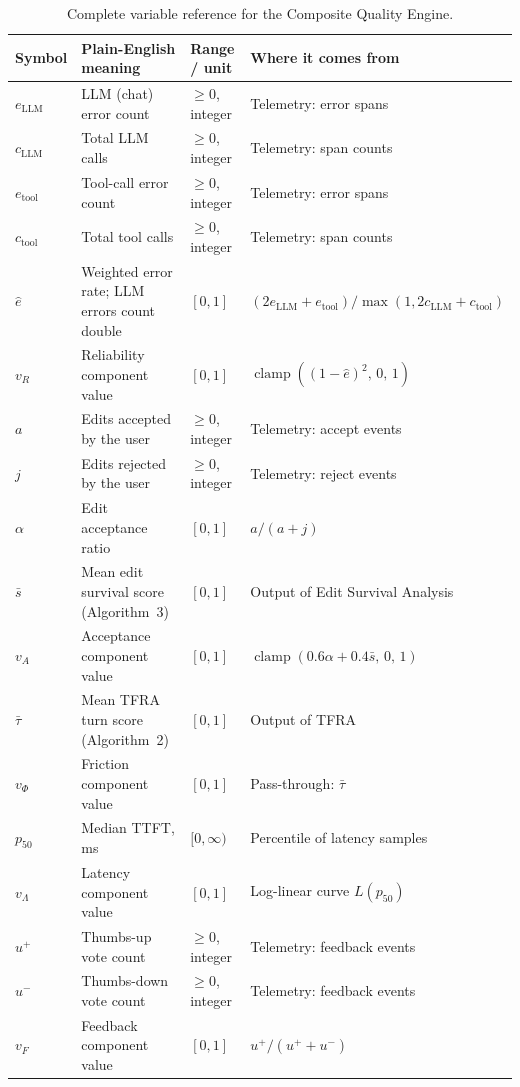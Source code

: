 \documentclass[11pt,a4paper]{article}
\newcommand{\clamp}[3]{\operatorname{clamp}\!\left(#1,\,#2,\,#3\right)}
\begin{document}
\begin{table}[h!]
\centering
\small
\caption{Complete variable reference for the Composite Quality Engine.}
\label{tab:var-ref}
\begin{tabular}{@{}p{1.7cm}p{4.4cm}p{2.0cm}p{5.2cm}@{}}
\toprule
Symbol & Plain-English meaning & Range / unit & Where it comes from \\
\midrule
$e_{\text{LLM}}$ & LLM (chat) error count & $\geq 0$, integer & Telemetry: error spans \\
$c_{\text{LLM}}$ & Total LLM calls & $\geq 0$, integer & Telemetry: span counts \\
$e_{\text{tool}}$ & Tool-call error count & $\geq 0$, integer & Telemetry: error spans \\
$c_{\text{tool}}$ & Total tool calls & $\geq 0$, integer & Telemetry: span counts \\
$\hat{e}$ & Weighted error rate; LLM errors count double & $[0,1]$ & $(2e_{\text{LLM}}+e_{\text{tool}})/\max(1,2c_{\text{LLM}}+c_{\text{tool}})$ \\
$v_R$ & Reliability component value & $[0,1]$ & $\clamp{(1-\hat{e})^2}{0}{1}$ \\
$a$ & Edits accepted by the user & $\geq 0$, integer & Telemetry: accept events \\
$j$ & Edits rejected by the user & $\geq 0$, integer & Telemetry: reject events \\
$\alpha$ & Edit acceptance ratio & $[0,1]$ & $a/(a+j)$ \\
$\bar{s}$ & Mean edit survival score (Algorithm~3) & $[0,1]$ & Output of Edit Survival Analysis \\
$v_A$ & Acceptance component value & $[0,1]$ & $\clamp{0.6\alpha+0.4\bar{s}}{0}{1}$ \\
$\bar{\tau}$ & Mean TFRA turn score (Algorithm~2) & $[0,1]$ & Output of TFRA \\
$v_\Phi$ & Friction component value & $[0,1]$ & Pass-through: $\bar{\tau}$ \\
$p_{50}$ & Median TTFT, ms & $[0,\infty)$ & Percentile of latency samples \\
$v_\Lambda$ & Latency component value & $[0,1]$ & Log-linear curve $L(p_{50})$ \\
$u^+$ & Thumbs-up vote count & $\geq 0$, integer & Telemetry: feedback events \\
$u^-$ & Thumbs-down vote count & $\geq 0$, integer & Telemetry: feedback events \\
$v_F$ & Feedback component value & $[0,1]$ & $u^+/(u^++u^-)$ \\

\end{tabular}
\end{table}
\end{document}
